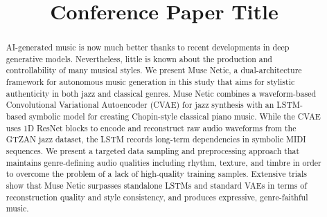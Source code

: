 \documentclass[conference]{IEEEtran}
\begin{document}
\title{Conference Paper Title\\}

\author{
\and
{}
\and
{}
\and
{}
\and
{}
\and
{}
}

\maketitle


\begin{abstract}
AI-generated music is now much better thanks to recent developments in deep generative models. Nevertheless, little is known about the production and controllability of many musical styles. We present Muse Netic, a dual-architecture framework for autonomous music generation in this study that aims for stylistic authenticity in both jazz and classical genres. Muse Netic combines a waveform-based Convolutional Variational Autoencoder (CVAE) for jazz synthesis with an LSTM-based symbolic model for creating Chopin-style classical piano music. While the CVAE uses 1D ResNet blocks to encode and reconstruct raw audio waveforms from the GTZAN jazz dataset, the LSTM records long-term dependencies in symbolic MIDI sequences. We present a targeted data sampling and preprocessing approach that maintains genre-defining audio qualities including rhythm, texture, and timbre in order to overcome the problem of a lack of high-quality training samples. Extensive trials show that Muse Netic surpasses standalone LSTMs and standard VAEs in terms of reconstruction quality and style consistency, and produces expressive, genre-faithful music.
\end{abstract}
\end{document}
